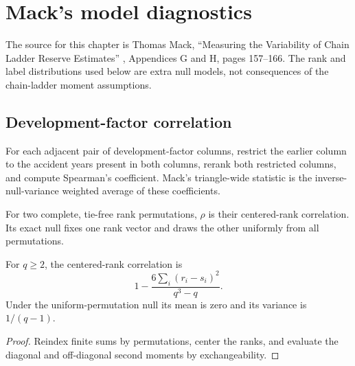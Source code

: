 \chapter{Mack's model diagnostics}

The source for this chapter is Thomas Mack, ``Measuring the Variability of
Chain Ladder Reserve Estimates'' \cite{Mack1994}, Appendices G and H,
pages 157--166. The rank and label distributions
used below are extra null models, not consequences of the chain-ladder moment
assumptions.

\section{Development-factor correlation}

\begin{definition}\label{def:mack1994-spearman}\leanok
For each adjacent pair of development-factor columns, restrict the earlier
column to the accident years present in both columns, rerank both restricted
columns, and compute Spearman's coefficient. Mack's triangle-wide statistic is
the inverse-null-variance weighted average of these coefficients.
\end{definition}

\begin{definition}\label{def:mack1994-permutation}\leanok
For two complete, tie-free rank permutations, $\rho$ is their centered-rank
correlation. Its exact null fixes one rank vector and draws the other uniformly
from all permutations.
\end{definition}

\begin{theorem}\label{thm:mack1994-spearman}\leanok
{}
For $q\ge2$, the centered-rank correlation is
\[
  1-\frac{6\sum_i(r_i-s_i)^2}{q^3-q}.
\]
Under the uniform-permutation null its mean is zero and its variance is
$1/(q-1)$.
\end{theorem}
\begin{proof}\leanok Reindex finite sums by permutations, center the ranks,
and evaluate the diagonal and off-diagonal second moments by exchangeability.
\end{proof}

